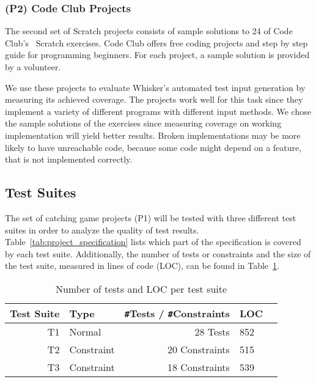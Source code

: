 \subsubsection{(P2) Code Club Projects}

The second set of Scratch projects consists of sample solutions to 24 of Code Club's~\cite{codeclub} Scratch exercises.
Code Club offers free coding projects and step by step guide for programming beginners.
For each project, a sample solution is provided by a volunteer.
\parspace

We use these projects to evaluate Whisker's automated test input generation by measuring its achieved coverage.
The projects work well for this task since they implement a variety of different programs with different input methods.
We chose the sample solutions of the exercises since measuring coverage on working implementation will yield better results.
Broken implementations may be more likely to have unreachable code,
because some code might depend on a feature, that is not implemented correctly.

\subsection{Test Suites}

The set of catching game projects (P1) will be tested with three different test suites in order to analyze the quality of test results.
Table~\ref{tab:project_specification} lists which part of the specification is covered by each test suite.
Additionally, the number of tests or constraints and the size of the test suite, measured in lines of code (LOC),
can be found in Table~\ref{tab:test_suite_statistics}.

\begin{table}[htpb]
    \centering
    \scriptsize
    \begin{tabular}{rlrlr}
        \toprule
        Test Suite & Type       & \texttt{\#}Tests / \texttt{\#}Constraints & LOC \\
        \midrule
        T1         & Normal     & 28 Tests                                  & 852 \\
        T2         & Constraint & 20 Constraints                            & 515 \\
        T3         & Constraint & 18 Constraints                            & 539 \\
        \bottomrule
    \end{tabular}

    \caption{Number of tests and LOC per test suite}
    \label{tab:test_suite_statistics}
\end{table}

